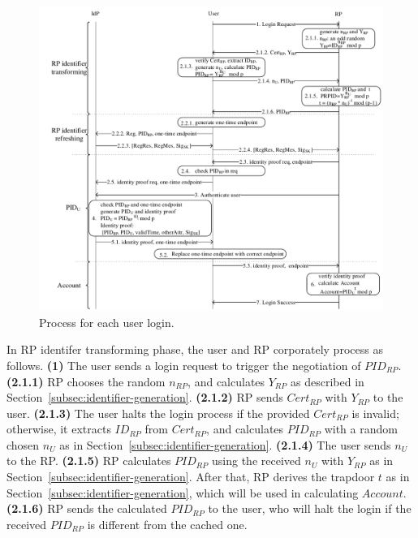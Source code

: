 \begin{figure}
  \centering
  \includegraphics[width=0.85\linewidth]{fig/process.pdf}
  \caption{Process for each user login.}
  \label{fig:process}
\end{figure}

In RP identifer transforming phase, the user and RP corporately process as follows. \textbf{(1)} The user sends a login request to trigger the negotiation of $PID_{RP}$. \textbf{(2.1.1)} RP chooses the random $n_{RP}$, and calculates $Y_{RP}$ as described in Section~\ref{subsec:identifier-generation}. \textbf{(2.1.2)} RP sends $Cert_{RP}$ with $Y_{RP}$ to the user.  \textbf{(2.1.3)} The user halts the login process if the provided $Cert_{RP}$ is invalid; otherwise, it extracts $ID_{RP}$ from $Cert_{RP}$, and calculates $PID_{RP}$ with a random chosen $n_U$ as in Section~\ref{subsec:identifier-generation}. \textbf{(2.1.4)} The user sends $n_U$ to the RP. \textbf{(2.1.5)} RP calculates $PID_{RP}$ using the received $n_U$ with $Y_{RP}$ as in Section~\ref{subsec:identifier-generation}. After that, RP derives the trapdoor $t$ as in Section~\ref{subsec:identifier-generation}, which will be used in calculating $Account$. \textbf{(2.1.6)} RP sends the calculated $PID_{RP}$ to the user, who will halt the login if the received $PID_{RP}$ is different from the cached one.


